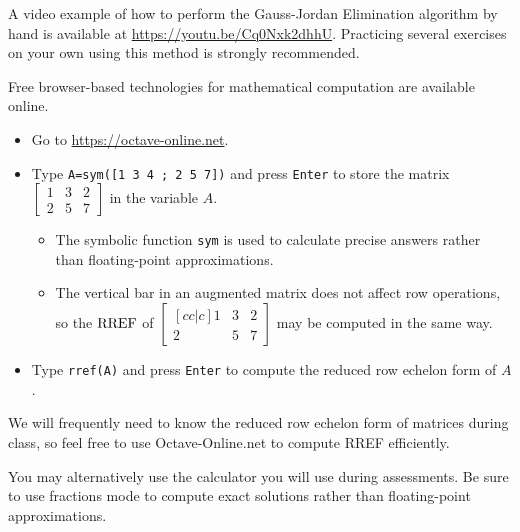 \begin{remark}
A video example of how to perform the Gauss-Jordan Elimination algorithm
by hand is available at \url{https://youtu.be/Cq0Nxk2dhhU}.
\vfill
Practicing several exercises on your own using this method is strongly
recommended.
\end{remark}





\begin{activity}{10}
Free browser-based technologies for mathematical computation
are available online.
\begin{itemize}
\item Go to \url{https://octave-online.net}.
\item Type \texttt{A=sym([1 3 4 ; 2 5 7])} and press \texttt{Enter}
      to store the matrix
      \(\begin{bmatrix} 1 & 3 & 2 \\ 2 & 5 & 7 \end{bmatrix}\)
      in the variable \(A\).
  \begin{itemize}
    \item The symbolic function \texttt{sym} is used to calculate precise answers 
          rather than floating-point approximations.
    \item The vertical bar in an augmented matrix does not affect
          row operations, so the \(\operatorname{RREF}\) of
      \(\begin{bmatrix}[cc|c] 1 & 3 & 2 \\ 2 & 5 & 7 \end{bmatrix}\)
          may be computed in the same way.
  \end{itemize}
\item Type \texttt{rref(A)} and press \texttt{Enter}
      to compute the reduced row echelon form of \(A\).
\end{itemize}
\end{activity}

\begin{remark}
We will frequently need to know the reduced row echelon form of matrices 
during class, so feel free to use Octave-Online.net to compute RREF
efficiently.

\vspace{1em}

You may alternatively use the calculator you will use during assessments.
Be sure to use fractions mode to compute exact solutions rather
than floating-point approximations. 
\end{remark}

